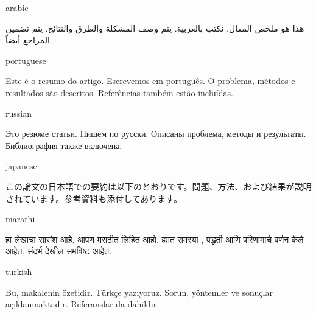 \documentclass[colorlinks,nofoot,fontspec,spanish,japanese,russian,greek,ukrainian,vietnamese,french,portuguese,turkish,polish,indonesian,italian,german,latin,serbianc,bidi=basic]{asmeconf}
\begin{document}
\begin{selectlanguage}{arabic}%
\begin{abstract*}\upshape
هذا هو ملخص المقال. نكتب بالعربية. يتم وصف المشكلة والطرق والنتائج. يتم تضمين المراجع أيضاً. 
\end{abstract*}
\end{selectlanguage}%

{\NotoSerif
\begin{selectlanguage}{portuguese}
\begin{abstract*}
Este é o resumo do artigo. Escrevemos em português. O problema, métodos e resultados são descritos. Referências também estão incluídas.
\end{abstract*}
\end{selectlanguage}%
}%

\begin{selectlanguage}{russian}
\begin{abstract*}
Это резюме статьи. Пишем по русски. Описаны проблема, методы и результаты. Библиография также включена.
\end{abstract*}
\end{selectlanguage}%

\begin{selectlanguage}{japanese}
\begin{abstract*}
この論文の日本語での要約は以下のとおりです。問題、方法、および結果が説明されています。参考資料も添付してあります。
\end{abstract*}
\end{selectlanguage}%

\begin{selectlanguage}{marathi}
\begin{abstract*}
हा लेखाचा सारांश आहे. आपण मराठीत लिहित आहो. ह्यात समस्या , पद्धती आणि परिणामाचे वर्णन केले आहेत. संदर्भ देखील समविष्ट आहेत. 
\end{abstract*}
\end{selectlanguage}%

{\NotoSerif
\begin{selectlanguage}{turkish}
\begin{abstract*}{\NotoSerifItalns
Bu, makalenin özetidir. Türkçe yazıyoruz. Sorun, yöntemler ve sonuçlar açıklanmaktadır. Referanslar da dahildir.}%
\end{abstract*}%
\end{selectlanguage}%
}%
\end{document}
